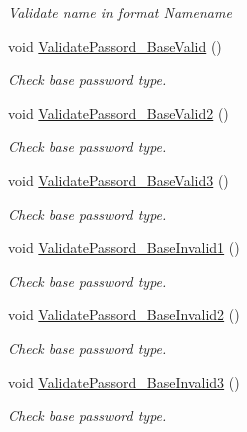 \begin{DoxyCompactItemize}
\begin{DoxyCompactList}\small\item\em Validate name in format Name\textquotesingle{}name \end{DoxyCompactList}\item 
void \mbox{\hyperlink{class_authority_controller_1_1_tests_1_1_regex_abef1a8fdb77661b756a9a63ab096f0c3}{Validate\+Passord\+\_\+\+Base\+Valid}} ()
\begin{DoxyCompactList}\small\item\em Check base password type. \end{DoxyCompactList}\item 
void \mbox{\hyperlink{class_authority_controller_1_1_tests_1_1_regex_a4a2cce934027f1cdd951fd4d5c09714f}{Validate\+Passord\+\_\+\+Base\+Valid2}} ()
\begin{DoxyCompactList}\small\item\em Check base password type. \end{DoxyCompactList}\item 
void \mbox{\hyperlink{class_authority_controller_1_1_tests_1_1_regex_a0b1f63c3941f89644380bcb6b729b389}{Validate\+Passord\+\_\+\+Base\+Valid3}} ()
\begin{DoxyCompactList}\small\item\em Check base password type. \end{DoxyCompactList}\item 
void \mbox{\hyperlink{class_authority_controller_1_1_tests_1_1_regex_a4fcbc4d36a79f9bacec8a9f0da0e14d5}{Validate\+Passord\+\_\+\+Base\+Invalid1}} ()
\begin{DoxyCompactList}\small\item\em Check base password type. \end{DoxyCompactList}\item 
void \mbox{\hyperlink{class_authority_controller_1_1_tests_1_1_regex_a63ed9f83338aac11d026b0c1a72fac1b}{Validate\+Passord\+\_\+\+Base\+Invalid2}} ()
\begin{DoxyCompactList}\small\item\em Check base password type. \end{DoxyCompactList}\item 
void \mbox{\hyperlink{class_authority_controller_1_1_tests_1_1_regex_afa0becd3ee2a08a74ec582f27b63bedd}{Validate\+Passord\+\_\+\+Base\+Invalid3}} ()
\begin{DoxyCompactList}\small\item\em Check base password type. \end{DoxyCompactList}\item 

\end{DoxyCompactItemize}
